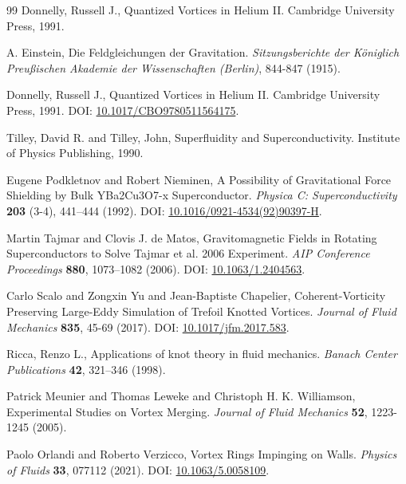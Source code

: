 \documentclass[a4paper,10pt]{article}
\begin{document}
\begin{thebibliography}{99}
Donnelly, Russell J.,
\newblock Quantized Vortices in Helium II.
\newblock Cambridge University Press, 1991.


A. Einstein,
\newblock Die Feldgleichungen der Gravitation.
\textit{Sitzungsberichte der Königlich Preußischen Akademie der Wissenschaften (Berlin)}, 844-847 (1915).


Donnelly, Russell J.,
\newblock Quantized Vortices in Helium II.
\newblock Cambridge University Press, 1991.
\newblock DOI: \href{https://doi.org/10.1017/CBO9780511564175}{10.1017/CBO9780511564175}.


Tilley, David R. and Tilley, John,
\newblock Superfluidity and Superconductivity.
\newblock Institute of Physics Publishing, 1990.


Eugene Podkletnov and Robert Nieminen,
\newblock A Possibility of Gravitational Force Shielding by Bulk YBa2Cu3O7-x Superconductor.
\textit{Physica C: Superconductivity} \textbf{203} (3-4), 441--444 (1992).
\newblock DOI: \href{https://doi.org/10.1016/0921-4534(92)90397-H}{10.1016/0921-4534(92)90397-H}.


Martin Tajmar and Clovis J. de Matos,
\newblock Gravitomagnetic Fields in Rotating Superconductors to Solve Tajmar et al. 2006 Experiment.
\textit{AIP Conference Proceedings} \textbf{880}, 1073--1082 (2006).
\newblock DOI: \href{https://doi.org/10.1063/1.2404563}{10.1063/1.2404563}.


Carlo Scalo and Zongxin Yu and Jean-Baptiste Chapelier,
\newblock Coherent-Vorticity Preserving Large-Eddy Simulation of Trefoil Knotted Vortices.
\textit{Journal of Fluid Mechanics} \textbf{835}, 45-69 (2017).
\newblock DOI: \href{https://doi.org/10.1017/jfm.2017.583}{10.1017/jfm.2017.583}.


Ricca, Renzo L.,
\newblock Applications of knot theory in fluid mechanics.
\textit{Banach Center Publications} \textbf{42}, 321--346 (1998).


Patrick Meunier and Thomas Leweke and Christoph H. K. Williamson,
\newblock Experimental Studies on Vortex Merging.
\textit{Journal of Fluid Mechanics} \textbf{52}, 1223-1245 (2005).


Paolo Orlandi and Roberto Verzicco,
\newblock Vortex Rings Impinging on Walls.
\textit{Physics of Fluids} \textbf{33}, 077112 (2021).
\newblock DOI: \href{https://doi.org/10.1063/5.0058109}{10.1063/5.0058109}.



\end{thebibliography}
\end{document}
